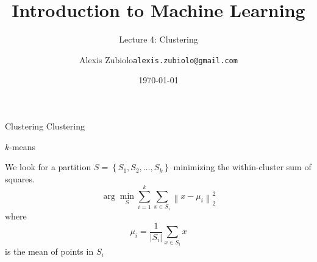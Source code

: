 \documentclass{beamer}
\title[Classification]{Introduction to Machine Learning}
\subtitle{Lecture 4: Clustering}
\author{Alexis Zubiolo\newline\texttt{alexis.zubiolo@gmail.com}}
\institute{Data Science Team Lead @ Adcash}
\date{\today}
\newcommand{\norm}[1]{\left\lVert#1\right\rVert}
\begin{document}
\begin{frame}
  \titlepage
\end{frame}

\begin{frame}{Clustering}
Clustering 
\end{frame}

\begin{frame}{$k$-means}

We look for a partition $S = \left\{ S_1, S_2, \dots, S_k\right\}$ minimizing the within-cluster sum of squares.
\begin{equation*}
\arg \min_S \sum_{i = 1}^{k} \sum_{x \in S_i} \norm{x - \mu_i}_2^2
\end{equation*}
where 
\begin{equation*}
\mu_i = \dfrac{1}{|S_i|} \sum_{x \in S_i} x
\end{equation*}
is the mean of points in $S_i$
\end{frame}
\end{document}
